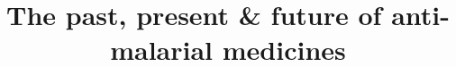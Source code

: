 \documentclass[twocolumn]{bmcart}%
\begin{document}
\begin{frontmatter}

\begin{fmbox}


\title{The past, present \& future of anti-malarial medicines}


\author[
addressref={aff1},                   %
]{ }
\author[
addressref={aff1},
]{ }
\author[
addressref={aff1,aff3},
email={matthew.todd@ucl.ac.uk}
]{ }


\address[id=aff1]{%
  , %
  ,                              %
}


\end{fmbox}
\end{frontmatter}
\end{document}
